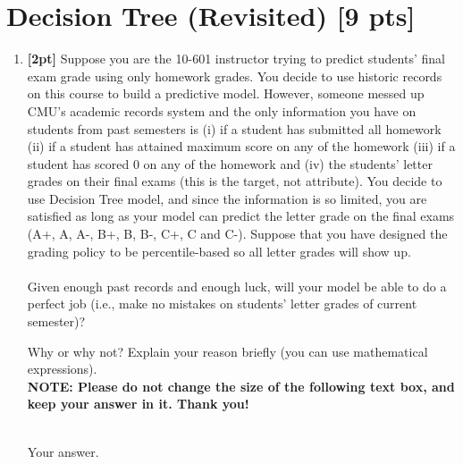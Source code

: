 \section{Decision Tree (Revisited) [9 pts]}


\begin{enumerate}

    \item \textbf{[2pt]} Suppose you are the 10-601 instructor trying to predict students' final exam grade using only homework grades. You decide to use historic records on this course to build a predictive model. However, someone messed up CMU's academic records system and the only information you have on students from past semesters is (i) if a student has submitted all homework (ii) if a student has attained maximum score on any of the homework (iii) if a student has scored 0 on any of the homework and  (iv) the students' letter grades on their final exams (this is the target, not attribute). You decide to use Decision Tree model, and since the information is so limited, you are satisfied as long as your model can predict the letter grade on the final exams  (A+, A, A-, B+, B, B-, C+, C and C-). Suppose that you have designed the grading policy to be percentile-based so all letter grades will show up. \\ \\
    Given enough past records and enough luck, will your model be able to do a perfect job (i.e., make no mistakes on students' letter grades of current semester)?
    
    Why or why not? Explain your reason briefly (you can use mathematical expressions).\\
    
    \textbf{NOTE: Please do not change the size of the following text box, and keep your answer in it. Thank you!} \\ \\
    \begin{tcolorbox}[fit,height=2cm, width=15cm, blank, borderline={1pt}{-2pt},nobeforeafter]
    \large
    Your answer.

    \end{tcolorbox} \\
    

\end{enumerate}
